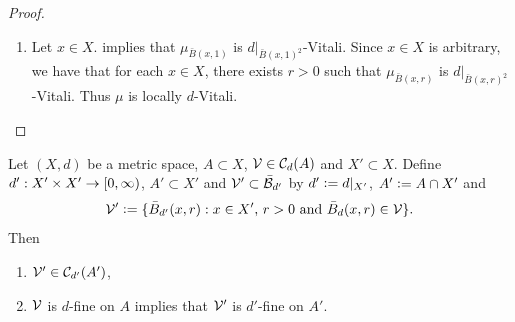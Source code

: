 \documentclass{book}
\begin{document}
\begin{proof}
\begin{enumerate}
\begin{itemize}
\begin{itemize}
					Since $\MF$ $\mu^*$-covers $A$, we then have that
					\begin{align*}
						(\mu')^* \bigg[ A \setminus \bigg(\bigcup_{S \in \MF'} S \bigg) \bigg] 
						& = (\mu^*)_{X_0} \bigg[ A \setminus \bigg(\bigcup_{S \in \MF'} S \bigg) \bigg] \quad \text{(by \rex{ex:subspace_measures:00005.1})} \\
						& = \mu^* \bigg[ A \setminus \bigg(\bigcup_{S \in \MF'} S \bigg) \bigg] \quad \text{(since $A \subset X_0$)} \\
						& = \mu^* \bigg[ A \setminus \bigg(\bigcup_{S \in \MF} (S \cap X_0) \bigg) \bigg] \\
						& = \mu^* \bigg[ A \setminus \bigg( \bigcup_{S \in \MF} S  \bigg) \bigg] \quad \text{(by \tcr{ref above})} \\
						& = 0. 
					\end{align*} 
					Thus $\MF'$ $(\mu')^*$-covers $A$.
				\end{itemize}
			\end{itemize}
			Since $A \subset X_0$ and $\MV' \subset \MC_{d'}(A)$ such that $\MV$ is $d'$-fine on $A$ are arbitrary, we have that for each $A \subset X_0$ and $\MV' \subset \MC_{d'}(A)$, $\MV$ is $d'$-fine on $A$ implies that there exists $\MF' \subset \MV'$ such that 
			\begin{itemize}
				\item $\MF$ is countable,
				\item $\MF$ is disjoint,
				\item $\MF$ $(\mu')^*$-covers $A$.
			\end{itemize}
			Hence $\mu'$ is $d'$-Vitali. Since $x_0 \in X$ and $r_0 > 0$ are arbitrary, we have that for each $x \in X$ and $r > 0$, $\mu_{\bar{B}(x, r)}$ is $d|_{\bar{B}(x, r)^2}$-Vitali.
			\item Let $x \in X$.  implies that $\mu_{\bar{B}(x, 1)}$ is $d|_{\bar{B}(x, 1)^2}$-Vitali. Since $x \in X$ is arbitrary, we have that for each $x \in X$, there exists $r>0$ such that $\mu_{\bar{B}(x, r)}$ is $d|_{\bar{B}(x, r)^2}$-Vitali. Thus $\mu$ is locally $d$-Vitali.
		\end{enumerate}
	\end{proof}
	
	\begin{ex} 
		Let $(X, d)$ be a metric space, $A \subset X$, $\mathcal{V} \in \mathcal{C}_d(A)$ and $X' \subset X$. Define $d': X' \times X' \rightarrow [0,\infty)$, $A' \subset X'$ and $\mathcal{V}' \subset \bar{\mathcal{B}}_{d'}$ by $d' \vcentcolon= d|_{X'}$, $A' \vcentcolon= A \cap X'$ and 
		$$\mathcal{V}' \vcentcolon= \{\bar{B}_{d'}(x,r): \text{$x \in X'$, $r > 0$ and $\bar{B}_d(x,r) \in \mathcal{V}$}\}.$$ 
		Then
		\begin{enumerate}
			\item $\mathcal{V}' \in \mathcal{C}_{d'}(A')$,
			\item $\MV$ is $d$-fine on $A$ implies that $\mathcal{V}'$ is $d'$-fine on $A'$.
		\end{enumerate}
	\end{ex}
	
\end{document}
